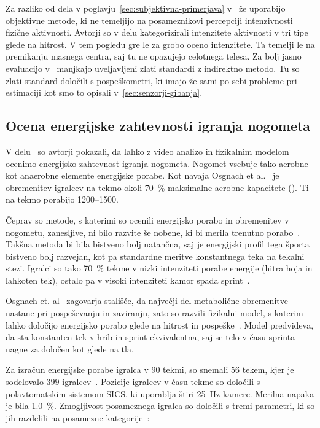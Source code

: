 Za razliko od dela v poglavju~\ref{sec:subjektivna-primerjava} v~\cite{silva2015assessing} že uporabijo objektivne metode, ki ne temeljijo na posameznikovi percepciji intenzivnosti fizične aktivnosti. Avtorji so v delu kategorizirali intenzitete aktivnosti v tri tipe glede na hitrost. V tem pogledu gre le za grobo oceno intenzitete. Ta temelji le na premikanju masnega centra, saj tu ne opazujejo celotnega telesa. Za bolj jasno evaluacijo v~\cite{silva2015assessing} manjkajo uveljavljeni zlati standardi z indirektno metodo. Tu so zlati standard določili s pospeškometri, ki imajo že sami po sebi probleme pri estimaciji kot smo to opisali v~\ref{sec:senzorji-gibanja}.




\subsection{Ocena energijske zahtevnosti igranja nogometa}

V delu~\cite{osgnach2010energy} so avtorji pokazali, da lahko z video analizo in fizikalnim modelom ocenimo energijsko zahtevnost igranja nogometa. Nogomet vsebuje tako aerobne kot anaerobne elemente energijske porabe. Kot navaja Osgnach et al.~\cite{osgnach2010energy} je obremenitev igralcev na tekmo okoli \SI{70}{\%} maksimalne aerobne kapacitete (\vomax). Ti na tekmo porabijo \SI{1200}{\kcal}--\SI{1500}{\kcal}. 

Čeprav so metode, s katerimi so ocenili energijsko porabo in obremenitev v nogometu, zanesljive, ni bilo razvite še nobene, ki bi merila trenutno porabo~\cite{osgnach2010energy}. Takšna metoda bi bila bistveno bolj natančna, saj je energijski profil tega športa bistveno bolj razvejan, kot pa standardne meritve konstantnega teka na tekalni stezi. Igralci so tako \SI{70}{\%} tekme v nizki intenziteti porabe energije (hitra hoja in lahkoten tek), ostalo pa v visoki intenziteti kamor spada sprint~\cite{osgnach2010energy}. 

Osgnach et. al~\cite{osgnach2010energy} zagovarja stališče, da največji del metabolične obremenitve nastane pri pospeševanju in zaviranju, zato so razvili fizikalni model, s katerim lahko določijo energijsko porabo glede na hitrost in pospeške~\cite{osgnach2010energy}. Model predvideva, da sta konstanten tek v hrib in sprint ekvivalentna, saj se telo v času sprinta nagne za določen kot glede na tla.  

Za izračun energijske porabe igralca v \SI{90}{\min} tekmi, so snemali $56$ tekem, kjer je sodelovalo $399$ igralcev~\cite{osgnach2010energy}. Pozicije igralcev v času tekme so določili s polavtomatskim sistemom SICS, ki uporablja štiri \SI{25}{\Hz} kamere. Merilna napaka je bila \SI{1.0}{\%}. Zmogljivost posameznega igralca so določili s tremi parametri, ki so jih razdelili na posamezne kategorije~\cite{osgnach2010energy}:

